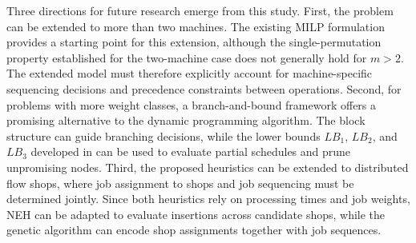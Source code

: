 ﻿\documentclass[12pt]{article}
\begin{document}
\begin{sloppypar}
Three directions for future research emerge from this study. 
First, the problem can be extended to more than two machines. 
The existing MILP formulation provides a starting point for this extension, 
although the single-permutation property established for the two-machine case does not generally hold for \(m>2\). 
The extended model must therefore explicitly account for machine-specific sequencing decisions 
and precedence constraints between operations. Second, for problems with more weight classes, 
a branch-and-bound framework offers a promising alternative to the dynamic programming algorithm. 
The block structure can guide branching decisions, while the lower bounds \(LB_1\), \(LB_2\), 
and \(LB_3\) developed in  can be used to evaluate partial schedules and prune unpromising nodes. 
Third, the proposed heuristics can be extended to distributed flow shops, 
where job assignment to shops and job sequencing must be determined jointly. 
Since both heuristics rely on processing times and job weights, NEH can be adapted to evaluate insertions 
across candidate shops, while the genetic algorithm can encode shop assignments together with job sequences.



\end{sloppypar}
\end{document}
